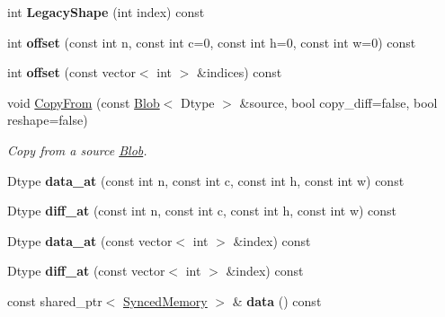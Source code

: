 \begin{DoxyCompactItemize}
\mbox{\label{classcaffe_1_1_blob_a7457487517943ac970bea8c7a7b9b92f}} 
int {\bfseries Legacy\+Shape} (int index) const
\item 
\mbox{\label{classcaffe_1_1_blob_adc31dcb34fd023452859158097a25216}} 
int {\bfseries offset} (const int n, const int c=0, const int h=0, const int w=0) const
\item 
\mbox{\label{classcaffe_1_1_blob_a80ef3ebc7ec6eba712a07113d3cb4cd2}} 
int {\bfseries offset} (const vector$<$ int $>$ \&indices) const
\item 
void \mbox{\hyperlink{classcaffe_1_1_blob_a64ad51f99e88233f43a21a85ebe10284}{Copy\+From}} (const \mbox{\hyperlink{classcaffe_1_1_blob}{Blob}}$<$ Dtype $>$ \&source, bool copy\+\_\+diff=false, bool reshape=false)
\begin{DoxyCompactList}\small\item\em Copy from a source \mbox{\hyperlink{classcaffe_1_1_blob}{Blob}}. \end{DoxyCompactList}\item 
\mbox{\label{classcaffe_1_1_blob_aaa1d03592e59bcf4b5626c49a031ccf3}} 
Dtype {\bfseries data\+\_\+at} (const int n, const int c, const int h, const int w) const
\item 
\mbox{\label{classcaffe_1_1_blob_af33d86470dcbb1a69962c211483d750a}} 
Dtype {\bfseries diff\+\_\+at} (const int n, const int c, const int h, const int w) const
\item 
\mbox{\label{classcaffe_1_1_blob_a4d62c7cd07790e33521795f5630dff5a}} 
Dtype {\bfseries data\+\_\+at} (const vector$<$ int $>$ \&index) const
\item 
\mbox{\label{classcaffe_1_1_blob_a556b160ac52301c6e67c9f3ba8e7b2a8}} 
Dtype {\bfseries diff\+\_\+at} (const vector$<$ int $>$ \&index) const
\item 
\mbox{\label{classcaffe_1_1_blob_ad9a11d2d67856e54647cdf31a6248c18}} 
const shared\+\_\+ptr$<$ \mbox{\hyperlink{classcaffe_1_1_synced_memory}{Synced\+Memory}} $>$ \& {\bfseries data} () const
\item 

\end{DoxyCompactItemize}
